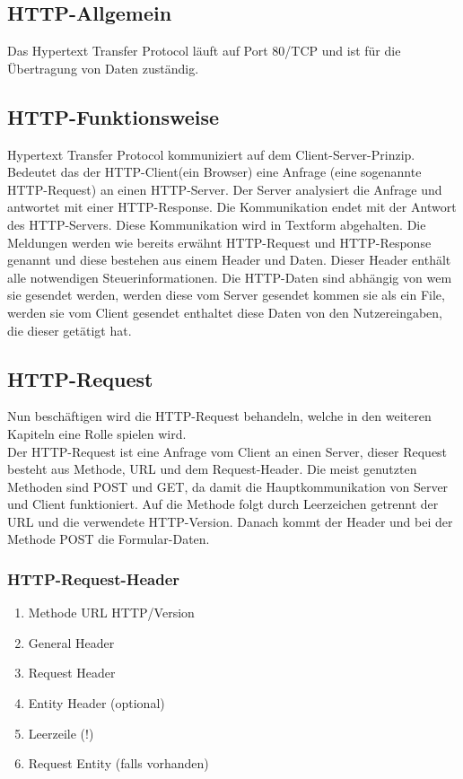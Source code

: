 \subsection{HTTP-Allgemein}
Das Hypertext Transfer Protocol läuft auf Port 80/TCP und ist für die Übertragung von Daten zuständig.
\subsection{HTTP-Funktionsweise}
Hypertext Transfer Protocol kommuniziert auf dem Client-Server-Prinzip. Bedeutet das der HTTP-Client(ein Browser) eine Anfrage (eine sogenannte HTTP-Request) an einen HTTP-Server. Der Server analysiert die Anfrage und antwortet mit einer HTTP-Response. Die Kommunikation endet mit der Antwort des HTTP-Servers. Diese Kommunikation wird in Textform abgehalten. Die Meldungen werden wie bereits erwähnt HTTP-Request und HTTP-Response genannt und diese bestehen aus einem Header und Daten. Dieser Header enthält alle notwendigen Steuerinformationen. Die HTTP-Daten sind abhängig von wem sie gesendet werden, werden diese vom Server gesendet kommen sie als ein File, werden sie vom Client gesendet enthaltet diese Daten von den Nutzereingaben, die dieser getätigt hat.
\subsection{HTTP-Request}
Nun beschäftigen wird die HTTP-Request behandeln, welche in den weiteren Kapiteln eine Rolle spielen wird.\\Der HTTP-Request ist eine Anfrage vom Client an einen Server, dieser Request besteht aus Methode, URL und dem Request-Header. Die meist genutzten Methoden sind POST und GET, da damit die Hauptkommunikation von Server und Client funktioniert. Auf die Methode folgt durch Leerzeichen getrennt der URL und die verwendete HTTP-Version. Danach kommt der Header und bei der Methode POST die Formular-Daten.
\subsubsection{HTTP-Request-Header}
\begin{enumerate}
\item Methode URL HTTP/Version
\item General Header
\item Request Header
\item Entity Header (optional)
\item Leerzeile (!)
\item Request Entity (falls vorhanden)
\end{enumerate}
